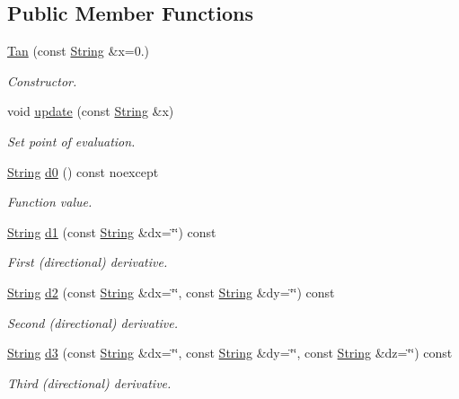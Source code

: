 \subsection*{Public Member Functions}
\begin{DoxyCompactItemize}
\item 
\hyperlink{structFunG_1_1stringify_1_1Tan_ad071dcc6d93344b964a8a956e65b453a}{Tan} (const \hyperlink{structFunG_1_1String}{String} \&x=0.)
\begin{DoxyCompactList}\small\item\em Constructor. \end{DoxyCompactList}\item 
void \hyperlink{structFunG_1_1stringify_1_1Tan_a9eb95af26686c19a00520b62389e36ff}{update} (const \hyperlink{structFunG_1_1String}{String} \&x)
\begin{DoxyCompactList}\small\item\em Set point of evaluation. \end{DoxyCompactList}\item 
\hyperlink{structFunG_1_1String}{String} \hyperlink{structFunG_1_1stringify_1_1Tan_a9ba69cac71a22d72580a395fc24ac173}{d0} () const noexcept
\begin{DoxyCompactList}\small\item\em Function value. \end{DoxyCompactList}\item 
\hyperlink{structFunG_1_1String}{String} \hyperlink{structFunG_1_1stringify_1_1Tan_a2cc62f52ed481d645efe4100e62aee6f}{d1} (const \hyperlink{structFunG_1_1String}{String} \&dx=\char`\"{}\char`\"{}) const 
\begin{DoxyCompactList}\small\item\em First (directional) derivative. \end{DoxyCompactList}\item 
\hyperlink{structFunG_1_1String}{String} \hyperlink{structFunG_1_1stringify_1_1Tan_a2d386bb2b1e8023862440c8eeb38c95c}{d2} (const \hyperlink{structFunG_1_1String}{String} \&dx=\char`\"{}\char`\"{}, const \hyperlink{structFunG_1_1String}{String} \&dy=\char`\"{}\char`\"{}) const 
\begin{DoxyCompactList}\small\item\em Second (directional) derivative. \end{DoxyCompactList}\item 
\hyperlink{structFunG_1_1String}{String} \hyperlink{structFunG_1_1stringify_1_1Tan_a9bd05c53a7833a6cddcab54f98cc2944}{d3} (const \hyperlink{structFunG_1_1String}{String} \&dx=\char`\"{}\char`\"{}, const \hyperlink{structFunG_1_1String}{String} \&dy=\char`\"{}\char`\"{}, const \hyperlink{structFunG_1_1String}{String} \&dz=\char`\"{}\char`\"{}) const 
\begin{DoxyCompactList}\small\item\em Third (directional) derivative. \end{DoxyCompactList}\end{DoxyCompactItemize}


